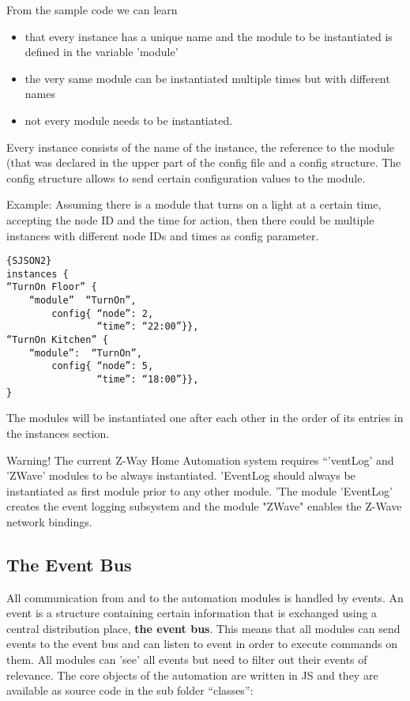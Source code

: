 From the sample code we can learn
\begin{itemize}
\item that every instance has a unique name and the module to be instantiated is defined in the variable 'module'
\item the very same module can be instantiated multiple times but with different names
\item not every module needs to be instantiated.
\end{itemize}

Every instance consists of the name of the instance, the reference to the module (that 
was declared in the upper part of the config file and a config structure. The config structure 
allows to send certain configuration values to the module. 

Example: Assuming there is a module that turns on a light at a certain time, accepting the 
node ID and the time for action, then there could be multiple instances with different 
node IDs and times as config  parameter.

\begin{lstlisting}[caption=Another Sample Config File - Instance Part]{SJSON2}
instances {
“TurnOn Floor” {
	“module”  “TurnOn”,
		config{	“node”: 2, 
				“time”: “22:00”}},
“TurnOn Kitchen” {
	“module”:  “TurnOn”,
		config{	“node”: 5, 
				“time”: “18:00”}},
}
\end{lstlisting}
The modules will be instantiated one after each other in the order of its 
entries in the instances section. 

Warning! The current Z-Way Home Automation system requires “'ventLog' and 'ZWave' modules to  be always instantiated. 'EventLog should always be instantiated as first module prior to any other module. 'The module 'EventLog'  creates the event logging subsystem and the module "ZWave" enables the Z-Wave network bindings.

\subsection{The Event Bus}

All communication from and to the automation modules is handled by events. An event is a structure containing certain information that is exchanged using a central distribution place, {\bf the event bus}. This means that all modules can send events to the event bus and can listen to event in order to execute commands on them. All modules can 'see' all events but need to filter out their events of relevance.  The core objects of the automation are written in JS and they are available as source code in the sub folder  “classes”:

